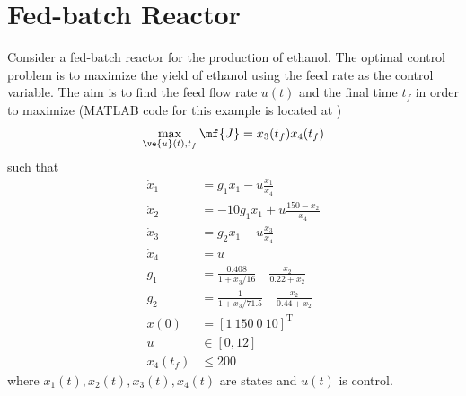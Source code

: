 \section{Fed-batch Reactor}
Consider a fed-batch reactor for the production of ethanol. The
optimal control problem is to maximize the yield of ethanol using the
feed rate as the control variable. The aim is to find the feed flow
rate $u(t)$ and the final time $t_f$ in order to maximize (MATLAB code for this example is located
at )
\begin{equation}
  \max_{\ve{u}(t), t_f} \mf{J} = x_{3}(t_{f})x_{4}(t_{f}) 
\end{equation}
such that
\begin{align*}
  \dot{x}_1 &= g_1x_1 - u\frac{x_1}{x_4}\\
  \dot{x}_2 &= -10g_1x_1 + u\frac{150-x_2}{x_4}\\
  \dot{x}_3 &= g_2x_1 - u\frac{x_3}{x_4}\\
  \dot{x}_4 &= u\\
  g_1       &= \frac{0.408}{1+x_3/16} \quad \frac{x_2}{0.22+x_2}\\
  g_2		  &= \frac{1}{1+x_3/71.5} \quad \frac{x_2}{0.44+x_2}\\
  x(0)	  &= [1~150~0~10]^{\textrm{T}}\\
  u &\in [0,12]\\
  x_4(t_f) &\leq 200
\end{align*}
where $ x_{1}(t),x_{2}(t),x_{3}(t),x_{4}(t)$ are states and $u(t)$ is control.
		
